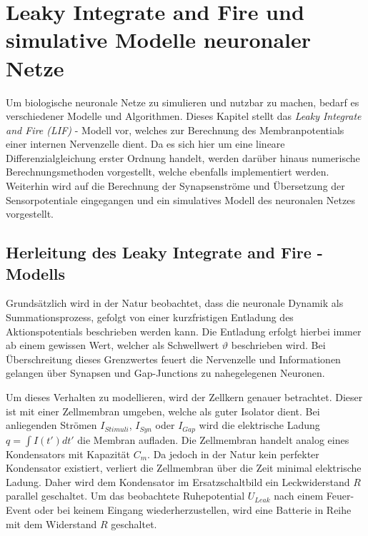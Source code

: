 %
\chapter{Leaky Integrate and Fire und simulative Modelle neuronaler Netze}
\label{chap:lif}
%

	Um biologische neuronale Netze zu simulieren und nutzbar zu machen, bedarf es verschiedener Modelle und Algorithmen. Dieses Kapitel stellt das \textit{Leaky Integrate and Fire (LIF)} - Modell vor, welches zur Berechnung des Membranpotentials einer internen Nervenzelle dient. Da es sich hier um eine lineare Differenzialgleichung erster Ordnung handelt, werden darüber hinaus numerische Berechnungsmethoden vorgestellt, welche ebenfalls implementiert werden. Weiterhin wird auf die Berechnung der Synapsenströme und Übersetzung der Sensorpotentiale eingegangen und ein simulatives Modell des neuronalen Netzes vorgestellt.

\section{Herleitung des Leaky Integrate and Fire - Modells}
\label{sec:lif_model}
	Grundsätzlich wird in der Natur beobachtet, dass die neuronale Dynamik als Summationsprozess, gefolgt von einer kurzfristigen Entladung des Aktionspotentials beschrieben werden kann. Die Entladung erfolgt hierbei immer ab einem gewissen Wert, welcher als Schwellwert $\vartheta$ beschrieben wird. Bei Überschreitung dieses Grenzwertes \glqq feuert\grqq{} die Nervenzelle und Informationen gelangen über Synapsen und Gap-Junctions zu nahegelegenen Neuronen.
	
	Um dieses Verhalten zu modellieren, wird der Zellkern genauer betrachtet. Dieser ist mit einer Zellmembran umgeben, welche als guter Isolator dient. Bei anliegenden Strömen $I_{Stimuli}$, $I_{Syn}$ oder $I_{Gap}$ wird die elektrische Ladung $q = \int I(t')dt'$ die Membran aufladen. Die Zellmembran handelt analog eines Kondensators mit Kapazität $C_m$. Da jedoch in der Natur kein perfekter Kondensator existiert, verliert die Zellmembran über die Zeit minimal elektrische Ladung. Daher wird dem Kondensator im Ersatzschaltbild ein Leckwiderstand $R$ parallel geschaltet. Um das beobachtete Ruhepotential $U_{Leak}$ nach einem Feuer-Event oder bei keinem Eingang wiederherzustellen, wird eine Batterie in Reihe mit dem Widerstand $R$ geschaltet.
	
